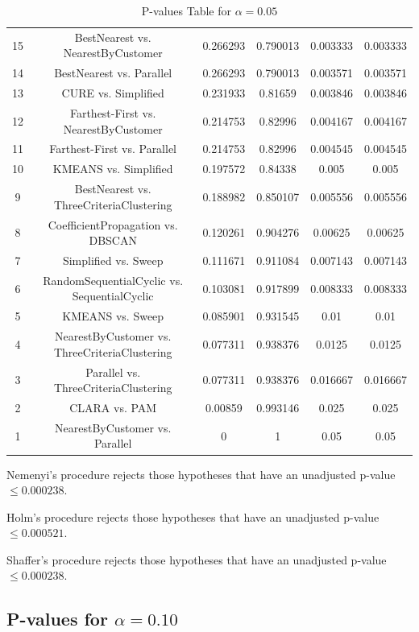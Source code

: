 \documentclass[a4paper,10pt]{article}
\begin{document}
\begin{landscape}
\begin{table}[!htp]
\begin{tabular}{cccccc}
15&BestNearest vs. NearestByCustomer&0.266293&0.790013&0.003333&0.003333\\
14&BestNearest vs. Parallel&0.266293&0.790013&0.003571&0.003571\\
13&CURE vs. Simplified&0.231933&0.81659&0.003846&0.003846\\
12&Farthest-First vs. NearestByCustomer&0.214753&0.82996&0.004167&0.004167\\
11&Farthest-First vs. Parallel&0.214753&0.82996&0.004545&0.004545\\
10&KMEANS vs. Simplified&0.197572&0.84338&0.005&0.005\\
9&BestNearest vs. ThreeCriteriaClustering&0.188982&0.850107&0.005556&0.005556\\
8&CoefficientPropagation vs. DBSCAN&0.120261&0.904276&0.00625&0.00625\\
7&Simplified vs. Sweep&0.111671&0.911084&0.007143&0.007143\\
6&RandomSequentialCyclic vs. SequentialCyclic&0.103081&0.917899&0.008333&0.008333\\
5&KMEANS vs. Sweep&0.085901&0.931545&0.01&0.01\\
4&NearestByCustomer vs. ThreeCriteriaClustering&0.077311&0.938376&0.0125&0.0125\\
3&Parallel vs. ThreeCriteriaClustering&0.077311&0.938376&0.016667&0.016667\\
2&CLARA vs. PAM&0.00859&0.993146&0.025&0.025\\
1&NearestByCustomer vs. Parallel&0&1&0.05&0.05\\
\hline
\end{tabular}
\caption{P-values Table for $\alpha=0.05$}
\end{table}Nemenyi's procedure rejects those hypotheses that have an unadjusted p-value $\le0.000238$.

Holm's procedure rejects those hypotheses that have an unadjusted p-value $\le0.000521$.

Shaffer's procedure rejects those hypotheses that have an unadjusted p-value $\le0.000238$.

\pagebreak

\subsection{P-values for $\alpha=0.10$}


\end{landscape}
\end{document}
